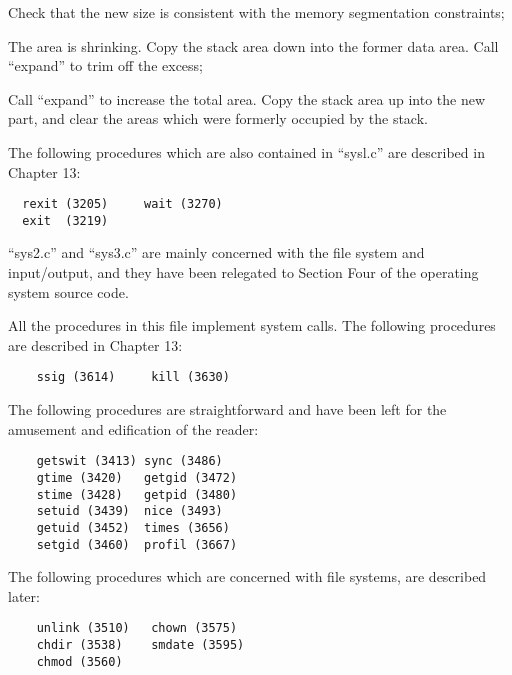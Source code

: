 \item[3371:] Check that the new size is consistent with the memory
segmentation constraints;

\item[3376:] The area is shrinking. Copy the
 stack area down into the former
 data area. Call ``expand'' to trim
 off the excess;

\item[3386:] Call ``expand'' to increase the
 total area. Copy the stack area
 up into the new part, and clear
the areas which were formerly
occupied by the stack.
\ed

The following procedures which are also
contained in ``sysl.c'' are described in
Chapter 13:

\begin{verbatim}
  rexit (3205)     wait (3270)
  exit  (3219)
\end{verbatim}


``sys2.c'' and ``sys3.c'' are mainly concerned with the file system and
input/output, and they have been
relegated to Section Four of the
operating system source code.



All the procedures in this file implement system calls.
The following procedures are described in Chapter 13:

\begin{verbatim}
    ssig (3614)     kill (3630)
\end{verbatim}

The following procedures are straightforward and have been left for the
amusement and edification of the reader:

\begin{verbatim}
    getswit (3413) sync (3486)
    gtime (3420)   getgid (3472)
    stime (3428)   getpid (3480)
    setuid (3439)  nice (3493)
    getuid (3452)  times (3656)
    setgid (3460)  profil (3667)
\end{verbatim}

The following procedures which are concerned with file systems, are described
later:

\begin{verbatim}
    unlink (3510)   chown (3575)
    chdir (3538)    smdate (3595)
    chmod (3560)
\end{verbatim}
